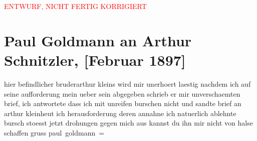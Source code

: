 
\begin{center}
            \textcolor{red}{ENTWURF, NICHT FERTIG KORRIGIERT}
                      \end{center}
            
               \section[Paul Goldmann an Arthur Schnitzler, {[}Februar 1897{]}]{ Paul Goldmann an Arthur Schnitzler, {[}Februar 1897{]}}\nopagebreak{}\rehead{ }\begin{ledgroupsized}[t]{13cm}\normalsize\beginnumbering{} \toendnotes[C]{\smallbreak\pagebreak[2]} 
\toendnotes[C]{\smallbreak}\pstart
           \noindent{}{\pb}hier befindlicher bruderarthur kleins wird mir unerhoert laestig nachdem ich auf seine
               aufforderung mein \label{T_L02638-3v}\label{T_L02638-3h} ueber sein \label{K_L02638-1v}\label{K_L02638-1h}
               abgegeben schrieb er mir unverschaemten brief, ich antwortete dass ich mit unreifen
               burschen nicht \label{T_L02638-2v}\label{T_L02638-2h} und sandte brief an arthur kleinheut{ }\label{T_L02638-1v}\label{T_L02638-1h} ich
               herausforderung deren annahne ich natuerlich ablehnte \label{T_L02638-4v}\label{T_L02638-4h} bursch stoesst jetzt drohungen gegen mich aus
               kannst du ihn mir nicht von halse schaffen\pend
           \pstart gruss \spacefill\mbox{paul goldmann =}\pend{}          \endnumbering{}\end{ledgroupsized}  \newcommand{\dateiname}{L02638}\newcommand{\titel}{Paul Goldmann an Arthur Schnitzler, [Februar 1897]}\newcommand{\editorInnen}{Martin Anton Müller und Laura Untner}
            \footnotesize
\begin{ledgroupsized}[t]{11.5cm}
\end{ledgroupsized}
         
      